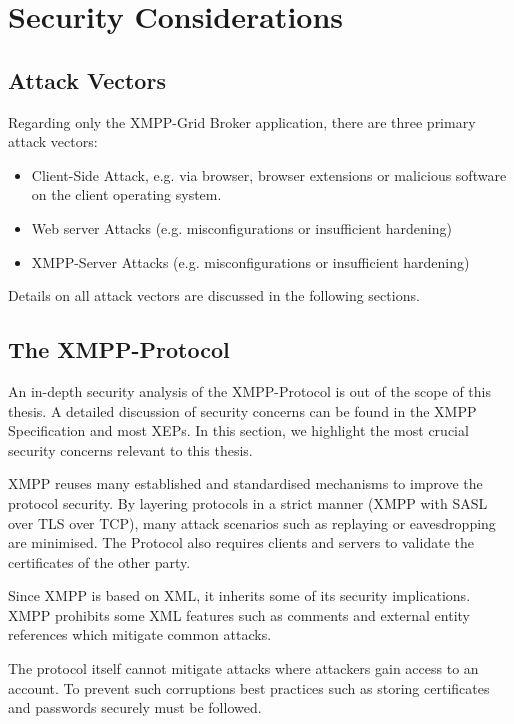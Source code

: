 \section{Security Considerations}

\subsection{Attack Vectors}

Regarding only the XMPP-Grid Broker application, there are three primary attack vectors:

\begin{itemize}
    \item Client-Side Attack, e.g. via browser, browser extensions or malicious software on the client operating system.
    \item Web server Attacks (e.g. misconfigurations or insufficient hardening)
    \item XMPP-Server Attacks (e.g. misconfigurations or insufficient hardening)
\end{itemize}

Details on all attack vectors are discussed in the following sections.

\subsection{The XMPP-Protocol}

An in-depth security analysis of the XMPP-Protocol is out of the scope of this thesis.
A detailed discussion of security concerns can be found in the XMPP Specification \cite{rfc6120} and most XEPs\cite{xep-0060}\cite{xep-0248}.
In this section, we highlight the most crucial security concerns relevant to this thesis.

XMPP reuses many established and standardised mechanisms to improve the protocol security.
By layering protocols in a strict manner (XMPP with SASL over TLS over TCP), many attack scenarios such as replaying or eavesdropping are minimised.
The Protocol also requires clients and servers to validate the certificates of the other party. \cite{rfc6120} 

Since XMPP is based on XML, it inherits some of its security implications.
XMPP prohibits some XML features such as comments and external entity references which mitigate common attacks. \cite{rfc6120} 

The protocol itself cannot mitigate attacks where attackers gain access to an account.
To prevent such corruptions best practices such as storing certificates and passwords securely must be followed.


